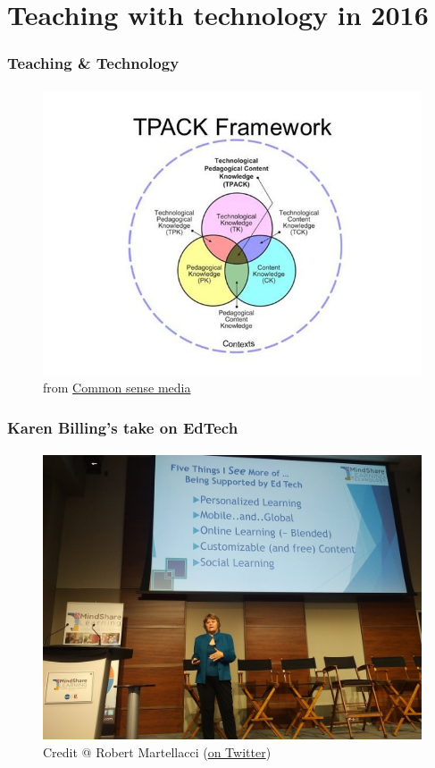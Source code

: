 \documentclass{beamer}
\begin{document}
\section[Section]{Teaching with technology in 2016}
	\begin{frame}
	\frametitle{Teaching \& Technology}
	\framesubtitle{}
	        \begin{figure}[h]
                \centering
                \includegraphics[width=.8\textwidth]{./images/tpack2}
		\caption{from \href{https://www.commonsensemedia.org/videos/introduction-to-the-tpack-model}{Common sense media}}
        	\end{figure}
	\end{frame}

	\begin{frame}
	\frametitle{Karen Billing's take on EdTech}
	\framesubtitle{}
	        \begin{figure}[h]
                \centering
                \includegraphics[width=.8\textwidth]{./images/KarenBillings-5thingsmore}
		\caption{Credit @ Robert Martellacci (\href{https://twitter.com/MindShareLearn/status/794166169477545984}{on Twitter})}
        	\end{figure}
	\end{frame}
\end{document}
